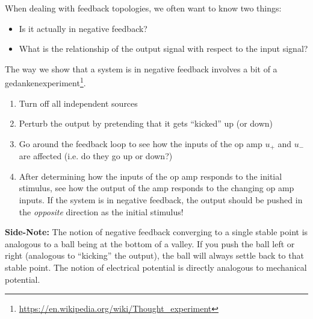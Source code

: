 {When dealing with feedback topologies, we often want to know two things:
\begin{itemize}
	\item Is it actually in negative feedback?
	\item What is the relationship of the output signal with respect to the input signal?
\end{itemize}
The way we show that a system is in negative feedback involves a bit of a gedankenexperiment\footnote{\url{https://en.wikipedia.org/wiki/Thought_experiment}}.
\begin{enumerate}
	\item Turn off all independent sources
	\item Perturb the output by pretending that it gets ``kicked'' up (or down)
	\item Go around the feedback loop to see how the inputs of the op amp $u_+$ and $u_-$ are affected (i.e. do they go up or down?)
	\item After determining how the inputs of the op amp responds to the initial stimulus, see how the output of the amp responds to the changing op amp inputs. If the system is in negative feedback, the output should be pushed in the \textit{opposite} direction as the initial stimulus! 
\end{enumerate}

\textbf{Side-Note:}
The notion of negative feedback converging to a single stable point is analogous to a ball being at the bottom of a valley. If you push the ball left or right (analogous to ``kicking'' the output), the ball will always settle back to that stable point. The notion of electrical potential is directly analogous to mechanical potential.

}
